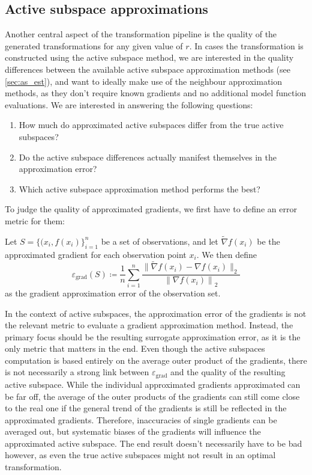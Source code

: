 \documentclass[
  a4paper,  %
  twoside,  %
  bibliography=totoc,
  headsepline,
  cleardoublepage=empty,
  parskip=half,
  draft=false
]{scrbook}
\begin{document}
\subsection{Active subspace approximations}

Another central aspect of the transformation pipeline is the quality of the generated transformations for any given value of $r$.
In cases the transformation is constructed using the active subspace method, we are interested in the quality differences between the available active subspace approximation methods (see \cref{sec:as_est}), and want to ideally make use of the neighbour approximation methods, as they don't require known gradients and no additional model function evaluations.
We are interested in answering the following questions:
\begin{enumerate}
\item How much do approximated active subspaces differ from the true active subspaces?
\item Do the active subspace differences actually manifest themselves in the approximation error?
\item Which active subspace approximation method performs the best?
\end{enumerate}
To judge the quality of approximated gradients, we first have to define an error metric for them:
\begin{definition}
Let $S=\{(x_i, f(x_i)\}_{i=1}^n$ be a set of observations, and let $\widetilde{\nabla} f(x_i)$ be the approximated gradient for each observation point $x_i$. We then define
\begin{equation}
\varepsilon_{\mathrm{grad}}(S) \coloneqq \frac{1}{n} \sum_{i=1}^n \frac{\|{\widetilde{\nabla} f(x_i) - \nabla f(x_i)}\|_2}{{\| \nabla f(x_i) \|}_2}
\label{eq:e_grad}
\end{equation}
as the gradient approximation error of the observation set.
\end{definition}
%
In the context of active subspaces, the approximation error of the gradients is not the relevant metric to evaluate a gradient approximation method.
Instead, the primary focus should be the resulting surrogate approximation error, as it is the only metric that matters in the end.
Even though the active subspaces computation is based entirely on the average outer product of the gradients, there is not necessarily a strong link between $\varepsilon_{\text{grad}}$ and the quality of the resulting active subspace.
While the individual approximated gradients approximated can be far off, the average of the outer products of the gradients can still come close to the real one if the general trend of the gradients is still be reflected in the approximated gradients.
Therefore, inaccuracies of single gradients can be averaged out, but systematic biases of the gradients will influence the approximated active subspace.
The end result doesn't necessarily have to be bad however, as even the true active subspaces might not result in an optimal transformation.
\end{document}
